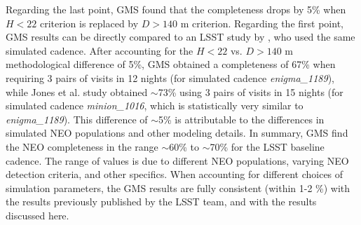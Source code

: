 Regarding the last point, GMS found that the completeness drops by 5\% when $H<22$ criterion is 
replaced by $D>140$ m criterion. Regarding  the first point, GMS results can be directly compared to an 
LSST study by \cite{JJI2016}, who used the same simulated cadence. After accounting for the $H<22$ vs. 
$D>140$ m methodological difference of 5\%, GMS obtained a completeness of 67\% when requiring 
3 pairs of visits in 12 nights (for simulated cadence {\it enigma\_1189}), while Jones et al. 
study obtained $\sim$73\% using 3 pairs of visits in 15 nights (for simulated cadence {\it minion\_1016}, 
which is statistically very similar to {\it enigma\_1189}). This difference of $\sim$5\% is attributable to 
the differences in simulated NEO populations and other modeling details. In summary, GMS find the NEO
completeness in the range $\sim$60\% to $\sim$70\% for the LSST baseline cadence. The range of values
is due to different NEO populations, varying NEO detection criteria, and other specifics. When accounting 
for different choices of simulation parameters, the GMS results are fully consistent (within 1-2 \%) with 
the results previously published by the LSST team, and with the results discussed here. 
